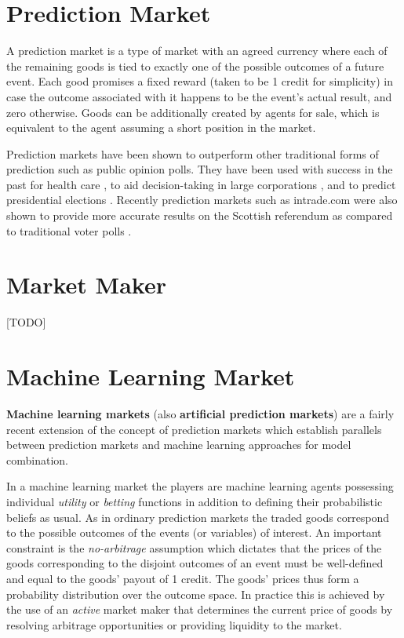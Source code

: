 \documentclass[bsc,frontabs,twoside,singlespacing,parskip,deptreport]{infthesis}     %
\begin{document}
\section{Prediction Market}

    A prediction market is a type of market with an agreed currency where each of the remaining goods is tied to exactly one of the possible outcomes of a future event. Each good promises a fixed reward (taken to be 1 credit for simplicity) in case the outcome associated with it happens to be the event's actual result, and zero otherwise. Goods can be additionally created by agents for sale, which is equivalent to the agent assuming a short position in the market. 
    
    Prediction markets have been shown to outperform other traditional forms of prediction such as public opinion polls. They have been used with success in the past for health care \cite{polgreen_use_2007}, to aid decision-taking in large corporations \cite{cowgill_using_2009}, and to predict presidential elections \cite{dudik_combinatorial_2013}. Recently prediction markets such as intrade.com were also shown to provide more accurate results on the Scottish referendum as compared to traditional voter polls \cite{bell_independence_2014}.

\section{Market Maker}
    [TODO]

\section{Machine Learning Market}
\label{sec:ml-markets}
    {\bf Machine learning markets} (also {\bf artificial prediction markets}) are a fairly recent extension of the concept of prediction markets which establish parallels between prediction markets and machine learning approaches for model combination. 

In a machine learning market the players are machine learning agents possessing individual {\em utility} or {\em betting} functions in addition to defining their probabilistic beliefs as usual. As in ordinary prediction markets the traded goods correspond to the possible outcomes of the events (or variables) of interest. An important constraint is the {\em no-arbitrage} assumption which dictates that the prices of the goods corresponding to the disjoint outcomes of an event must be well-defined and equal to the goods' payout of 1 credit. The goods' prices thus form a probability distribution over the outcome space. In practice this is achieved by the use of an {\em active} market maker that determines the current price of goods by resolving arbitrage opportunities or providing liquidity to the market. 
\end{document}
